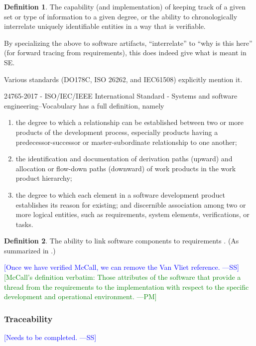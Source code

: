 \documentclass[letterpaper, cleveref]{lipics-v2019}
\newcommand{\authornote}[3]{\textcolor{#1}{[#3 ---#2]}}
\newcommand{\authornote}[3]{}
\newcommand{\wss}[1]{\authornote{blue}{SS}{#1}} %
\newcommand{\pmi}[1]{\authornote{green}{PM}{#1}} %
\theoremstyle{definition}
\newtheorem{defn}{Definition}
\begin{document}
\begin{defn}
  The capability (and implementation) of keeping track of a given set or
  type of information to a given degree, or the ability to chronologically
  interrelate uniquely identifiable entities in a way that is verifiable.
\end{defn}

By specializing the above to software artifacts, ``interrelate'' to ``why is
this here'' (for forward tracing from requirements), this does indeed give
what is meant in SE.

Various standards (DO178C, ISO 26262, and IEC61508) explicitly mention it.

24765-2017 - ISO/IEC/IEEE International Standard - Systems and software
engineering--Vocabulary has a full definition, namely
\begin{enumerate}
\item the degree to which a relationship can be established between two or more
  products of the development process, especially products having a
  predecessor-successor or master-subordinate relationship to one another;
\item the identification and documentation of derivation paths (upward) and
  allocation or flow-down paths (downward) of work products in the work product
  hierarchy;
\item the degree to which each element in a software development product
  establishes its reason for existing; and discernible association among two or
  more logical entities, such as requirements, system elements, verifications,
  or tasks.
\end{enumerate}

\begin{defn}
  The ability to link software components to requirements
  \citep{McCallEtAl1977}. (As summarized in \citet{VanVliet2000}.)
\end{defn} \wss{Once we have verified McCall, we can remove the Van Vliet
reference.}  \pmi{McCall's definition verbatim: Those attributes of the
software that provide a thread from the requirements to the implementation
with respect to the specific development and operational environment.}

\begin{mybox}
\subsubsection*{Traceability} 
\wss{Needs to be completed.}
\end{mybox}
\end{document}
